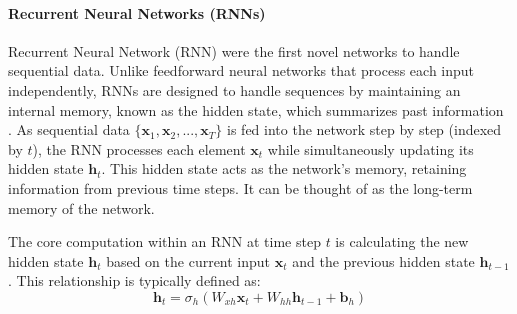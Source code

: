 \paragraph{\textbf{Recurrent Neural Networks (RNNs)}}
\label{sec:rnn}
Recurrent Neural Network (RNN) were the first novel networks to handle sequential data. Unlike feedforward neural networks that process each input independently, RNNs are designed to handle sequences by maintaining an internal memory, known as the hidden state, which summarizes past information \autocite{geron2022hands}. As sequential data \( \{ \bm{x}_1, \bm{x}_2, ..., \bm{x}_T \} \) is fed into the network step by step (indexed by \( t \)), the RNN processes each element \( \bm{x}_t \) while simultaneously updating its hidden state \( \bm{h}_t \). This hidden state acts as the network's memory, retaining information from previous time steps. It can be thought of as the long-term memory of the network.

The core computation within an RNN at time step \( t \) is calculating the new hidden state \( \bm{h}_t \) based on the current input \( \bm{x}_t \) and the previous hidden state \( \bm{h}_{t-1} \). This relationship is typically defined as:
\begin{equation}
    \bm{h}_t = \sigma_h (W_{xh} \bm{x}_t + W_{hh} \bm{h}_{t-1} + \bm{b}_h)
    \label{eq:rnn_hidden_state}
\end{equation}

